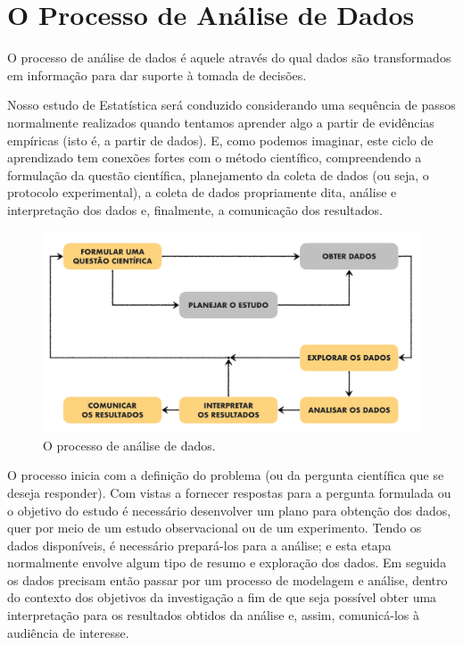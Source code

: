 \documentclass[
]{book}
\theoremstyle{definition}
\theoremstyle{definition}
\theoremstyle{definition}
\theoremstyle{remark}
\begin{document}
\hypertarget{o-processo-de-anuxe1lise-de-dados}{%
\section{O Processo de Análise de Dados}\label{o-processo-de-anuxe1lise-de-dados}}

O processo de análise de dados é aquele através do qual dados são transformados em informação para dar suporte à tomada de decisões.

Nosso estudo de Estatística será conduzido considerando uma sequência de passos normalmente realizados quando tentamos aprender algo a partir de evidências empíricas (isto é, a partir de dados). E, como podemos imaginar, este ciclo de aprendizado tem conexões fortes com o método científico, compreendendo a formulação da questão científica, planejamento da coleta de dados (ou seja, o protocolo experimental), a coleta de dados propriamente dita, análise e interpretação dos dados e, finalmente, a comunicação dos resultados.

\begin{figure}
\includegraphics[width=1\linewidth]{img/analise-dados} \caption{O processo de análise de dados.}\label{fig:ch1-analise-dados}
\end{figure}

O processo inicia com a definição do problema (ou da pergunta científica que se deseja responder). Com vistas a fornecer respostas para a pergunta formulada ou o objetivo do estudo é necessário desenvolver um plano para obtenção dos dados, quer por meio de um estudo observacional ou de um experimento. Tendo os dados disponíveis, é necessário prepará-los para a análise; e esta etapa normalmente envolve algum tipo de resumo e exploração dos dados. Em seguida os dados precisam então passar por um processo de modelagem e análise, dentro do contexto dos objetivos da investigação a fim de que seja possível obter uma interpretação para os resultados obtidos da análise e, assim, comunicá-los à audiência de interesse.
\end{document}
